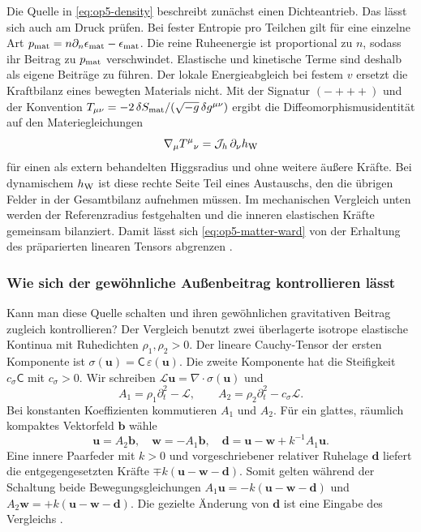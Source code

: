 Die Quelle in \eqref{eq:op5-density} beschreibt zunächst einen Dichteantrieb. Das lässt sich auch am Druck prüfen. Bei fester Entropie pro Teilchen gilt für eine einzelne Art \(p_{\rm mat}=n\partial_n\epsilon_{\rm mat}-\epsilon_{\rm mat}\). Die reine Ruheenergie ist proportional zu \(n\), sodass ihr Beitrag zu \(p_{\rm mat}\) verschwindet. Elastische und kinetische Terme sind deshalb als eigene Beiträge zu führen. Der lokale Energieabgleich bei festem \(v\) ersetzt die Kraftbilanz eines bewegten Materials nicht. Mit der Signatur \((-+++)\) und der Konvention \(T_{\mu\nu}=-2\,\delta S_{\rm mat}/(\sqrt{-g}\,\delta g^{\mu\nu})\) ergibt die Diffeomorphismusidentität auf den Materiegleichungen
\begin{equation}
 \nabla_\mu T^\mu{}_\nu=\mathcal J_h\,\partial_\nu h_{\rm W}
 \label{eq:op5-matter-ward}
\end{equation}
für einen als extern behandelten Higgsradius und ohne weitere äußere Kräfte. Bei dynamischem \(h_{\rm W}\) ist diese rechte Seite Teil eines Austauschs, den die übrigen Felder in der Gesamtbilanz aufnehmen müssen. Im mechanischen Vergleich unten werden der Referenzradius festgehalten und die inneren elastischen Kräfte gemeinsam bilanziert. Damit lässt sich \eqref{eq:op5-matter-ward} von der Erhaltung des präparierten linearen Tensors abgrenzen \cite{op5-density}.

\subsubsection{Wie sich der gewöhnliche Außenbeitrag kontrollieren lässt}

Kann man diese Quelle schalten und ihren gewöhnlichen gravitativen Beitrag zugleich kontrollieren? Der Vergleich benutzt zwei überlagerte isotrope elastische Kontinua mit Ruhedichten \(\rho_1,\rho_2>0\). Der lineare Cauchy-Tensor der ersten Komponente ist \(\sigma(\mathbf u)=\mathsf C\,\varepsilon(\mathbf u)\). Die zweite Komponente hat die Steifigkeit \(c_\sigma\mathsf C\) mit \(c_\sigma>0\). Wir schreiben \(\mathcal L\mathbf u=\nabla\cdot\sigma(\mathbf u)\) und
\begin{equation}
 A_1=\rho_1\partial_t^2-\mathcal L,\qquad
 A_2=\rho_2\partial_t^2-c_\sigma\mathcal L .
 \label{eq:op5-elastic}
\end{equation}
Bei konstanten Koeffizienten kommutieren \(A_1\) und \(A_2\). Für ein glattes, räumlich kompaktes Vektorfeld \(\mathbf b\) wähle
\[
 \mathbf u=A_2\mathbf b,\quad
 \mathbf w=-A_1\mathbf b,\quad
 \mathbf d=\mathbf u-\mathbf w+k^{-1}A_1\mathbf u .
\]
Eine innere Paarfeder mit \(k>0\) und vorgeschriebener relativer Ruhelage \(\mathbf d\) liefert die entgegengesetzten Kräfte \(\mp k(\mathbf u-\mathbf w-\mathbf d)\). Somit gelten während der Schaltung beide Bewegungsgleichungen \(A_1\mathbf u=-k(\mathbf u-\mathbf w-\mathbf d)\) und \(A_2\mathbf w=+k(\mathbf u-\mathbf w-\mathbf d)\). Die gezielte Änderung von \(\mathbf d\) ist eine Eingabe des Vergleichs \cite{op5-motion}.

